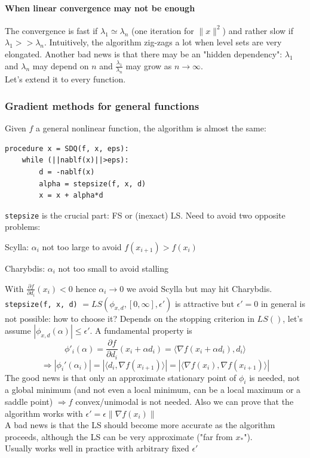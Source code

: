 \documentclass[10pt]{report}
\begin{document}
\paragraph{When linear convergence may not be enough} The convergence is fast if $\lambda_1\simeq \lambda_n$ (one iteration for $\|x\|^2$) and rather slow if $\lambda_1 >> \lambda_n$. Intuitively, the algorithm zig-zags a lot when level sets are very elongated. Another bad news is that there may be an "hidden dependency": $\lambda_1$ and $\lambda_n$ may depend on $n$ and $\frac{\lambda_1}{\lambda_n}$ may grow as $n\rightarrow\infty$.\\
Let's extend it to every function.
\subsubsection{Gradient methods for general functions}
Given $f$ a general nonlinear function, the algorithm is almost the same:
\begin{lstlisting}[style=myPython]
procedure x = SDQ(f, x, eps):
	while (||nablf(x)||>eps):
		d = -nablf(x)
		alpha = stepsize(f, x, d)
		x = x + alpha*d
\end{lstlisting}
\texttt{stepsize} is the crucial part: FS or (inexact) LS. Need to avoid two opposite problems:
\begin{list}{}{}
	\item Scylla: $\alpha_i$ not too large to avoid $f(x_{i+1}) > f(x_i)$
	\item Charybdis: $\alpha_i$ not too small to avoid stalling
\end{list}
With $\frac{\partial f}{\partial d_i}(x_i)<0$ hence $\alpha_i\rightarrow 0$ we avoid Scylla but may hit Charybdis.\\
\texttt{stepsize(f, x, d)} $= LS(\phi_{x,d}, [0,\infty], \epsilon')$ is attractive but $\epsilon' = 0$ in general is not possible: how to choose it? Depends on the stopping criterion in $LS()$, let's assume $|\phi_{x,d}(\alpha)| \leq \epsilon'$. A fundamental property is $$\phi'_i(\alpha) = \frac{\partial f}{\partial d_i}(x_i + \alpha d_i) = \langle\nabla f(x_i+\alpha d_i), d_i\rangle$$
$$\Rightarrow |\phi_i'(\alpha_i)| = |\langle d_i, \nabla f(x_{i+1})\rangle| = |\langle \nabla f(x_i),\nabla f(x_{i+1})\rangle|$$
The good news is that only an approximate stationary point of $\phi_i$ is needed, not a global minimum (and not even a local minimum, can be a local maximum or a saddle point) $\Rightarrow f$ convex/unimodal is not needed. Also we can prove that the algorithm works with $\epsilon' = \epsilon \|\nabla f(x_i)\|$\\
A bad news is that the LS should become more accurate as the algorithm proceeds, although the LS can be very approximate ("far from $x_*$").\\
Usually works well in practice with arbitrary fixed $\epsilon'$
\end{document}
